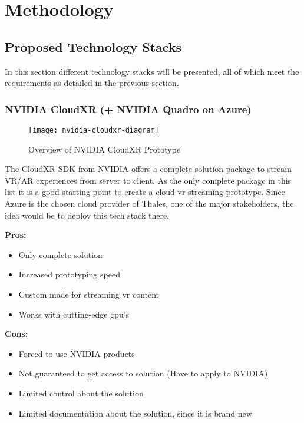 \section{Methodology}

\subsection{Proposed Technology Stacks}
In this section different technology stacks will be presented, all of which meet the requirements as detailed in the previous section.

\subsubsection{NVIDIA CloudXR (+ NVIDIA Quadro on Azure)}
\begin{figure}[h!]
\caption{Overview of NVIDIA CloudXR Prototype \parencite{cloudxr}}
\label{fig:pr0}
\texttt{[image: nvidia-cloudxr-diagram]}
\end{figure}

The CloudXR SDK from NVIDIA offers a complete solution package to stream VR/AR experiences from server to client. As the only complete package in this list it is a good starting point to create a cloud \acrshort{vr} streaming prototype. Since Azure is the chosen cloud provider of Thales, one of the major stakeholders, the idea would be to deploy this tech stack there. \\
\newline
\begin{varwidth}[t]{.5\textwidth}
\renewcommand\labelitemi{+}
\textbf{Pros:}
\begin{itemize}
\item Only complete solution
\item Increased prototyping speed
\item Custom made for streaming \acrshort{vr} content
\item Works with cutting-edge \acrshort{gpu}'s
\end{itemize}
\end{varwidth}
\hspace{4em}
\begin{varwidth}[t]{.5\textwidth}
\renewcommand\labelitemi{-}
\textbf{Cons:}
\begin{itemize}
\item Forced to use NVIDIA products
\item Not guaranteed to get access to solution (Have to apply to NVIDIA)
\item Limited control about the solution
\item Limited documentation about the solution, since it is brand new
\end{itemize}
\end{varwidth}

